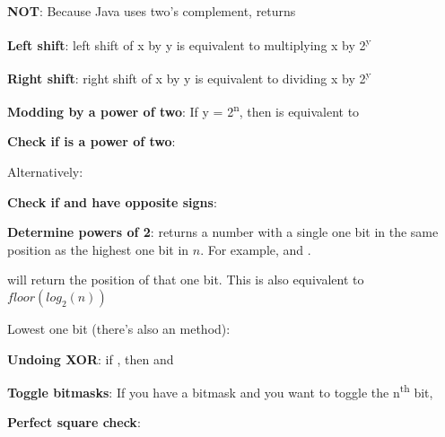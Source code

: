 
\textbf{NOT}: Because Java uses two's complement,  returns 

\textbf{Left shift}: left shift of x by y is equivalent to multiplying x by 2\textsuperscript{y}

\textbf{Right shift}: right shift of x by y is equivalent to dividing x by 2\textsuperscript{y}

\textbf{Modding by a power of two}: If y = 2\textsuperscript{n}, then  is equivalent to 

\textbf{Check if  is a power of two}: 

Alternatively: 

\textbf{Check if  and  have opposite signs}: 

\textbf{Determine powers of 2}:  returns a number with a single one bit in the same position as the highest one bit in $n$. For example,  and .

 will return the position of that one bit. This is also equivalent to $floor(log_2 (n))$

Lowest one bit (there's also an  method): 

\textbf{Undoing XOR}: if , then  and 

\textbf{Toggle bitmasks}: If you have a bitmask and you want to toggle the n\textsuperscript{th} bit, 

\textbf{Perfect square check}:






\newpage